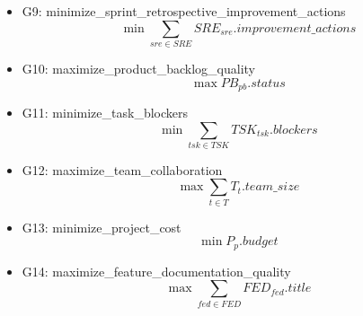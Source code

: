 \documentclass{article}
\begin{document}
\begin{itemize}
\begin{equation*}
        \end{equation*}
    \item G9: minimize\_sprint\_retrospective\_improvement\_actions
        \begin{equation*}
            \min \sum_{sre \in SRE} SRE_{sre}.improvement\_actions
        \end{equation*}
    \item G10: maximize\_product\_backlog\_quality
        \begin{equation*}
            \max PB_{pb}.status
        \end{equation*}
    \item G11: minimize\_task\_blockers
        \begin{equation*}
            \min \sum_{tsk \in TSK} TSK_{tsk}.blockers
        \end{equation*}
    \item G12: maximize\_team\_collaboration
        \begin{equation*}
            \max \sum_{t \in T} T_{t}.team\_size
        \end{equation*}
    \item G13: minimize\_project\_cost
        \begin{equation*}
            \min P_{p}.budget
        \end{equation*}
    \item G14: maximize\_feature\_documentation\_quality
        \begin{equation*}
            \max \sum_{fed \in FED} FED_{fed}.title
        \end{equation*}
\end{itemize}
\end{document}
